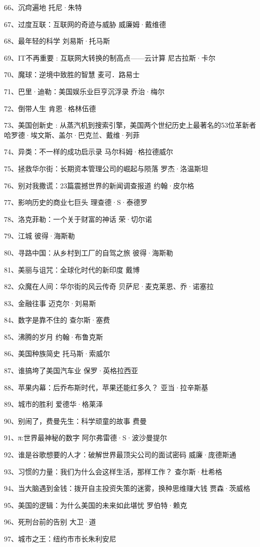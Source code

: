 66、沉疴遍地 托尼·朱特

67、过度互联：互联网的奇迹与威胁 威廉姆·戴维德

68、最年轻的科学 刘易斯·托马斯

69、IT不再重要 : 互联网大转换的制高点------云计算 尼古拉斯·卡尔

70、魔球：逆境中致胜的智慧 麦可．路易士

71、巴里·迪勒：美国娱乐业巨亨沉浮录 乔治·梅尔

72、倒带人生 肯恩·格林伍德

73、美国创新史 : 从蒸汽机到搜索引擎，美国两个世纪历史上最著名的53位革新者
哈罗德·埃文斯、盖尔·巴克兰、戴维·列菲

74、异类：不一样的成功启示录 马尔科姆·格拉德威尔

75、拯救华尔街：长期资本管理公司的崛起与陨落 罗杰·洛温斯坦

76、别对我撒谎：23篇震撼世界的新闻调查报道 约翰·皮尔格

77、影响历史的商业七巨头 理查德·S·泰德罗

78、洛克菲勒：一个关于财富的神话 荣·切尔诺

79、江城 彼得·海斯勒

80、寻路中国：从乡村到工厂的自驾之旅 彼得·海斯勒

81、美丽与诅咒：全球化时代的新印度 戴博

82、众魔在人间：华尔街的风云传奇 贝萨尼·麦克莱恩、乔·诺塞拉

83、金融往事 迈克尔·刘易斯

84、数字是靠不住的 查尔斯·塞费

85、沸腾的岁月 约翰·布鲁克斯

86、美国种族简史 托马斯·索威尔

87、谁搞垮了美国汽车业 保罗·英格拉西亚

88、苹果内幕：后乔布斯时代，苹果还能红多久？ 亚当·拉辛斯基

89、城市的胜利 爱德华·格莱泽

90、别闹了，费曼先生：科学顽童的故事 费曼

91、π:世界最神秘的数字 阿尔弗雷德·S·波沙曼提尔

92、谁是谷歌想要的人才：破解世界最顶尖公司的面试密码 威廉·庞德斯通

93、习惯的力量：我们为什么会这样生活，那样工作？ 查尔斯·杜希格

94、当大脑遇到金钱：拨开自主投资失策的迷雾，换种思维赚大钱 贾森·茨威格

95、美国的逻辑：为什么美国的未来如此堪忧 罗伯特·赖克

96、死刑台前的告别 大卫·道

97、城市之王：纽约市市长朱利安尼
